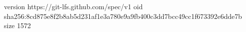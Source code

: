 version https://git-lfs.github.com/spec/v1
oid sha256:8cd875e8f2b8ab5d231af1e3a780e9a9fb400c3dd7bcc49cc1f673392e6dde7b
size 1572
